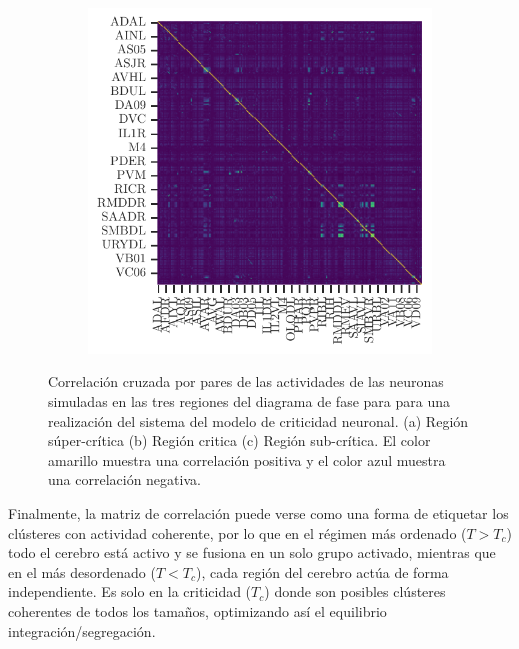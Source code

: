 \begin{figure}[h!]
\begin{subfigure}[b]{0.3\textwidth}
		\caption{}
		\label{fig:correlacion_critico}
	\end{subfigure}
	\begin{subfigure}[b]{0.3\textwidth}
		\centering
		\includegraphics[width=\textwidth]{correlacion_sub_critico.pdf}
		\caption{}
		\label{fig:correlacion_sub_critico}
	\end{subfigure}
	\caption[ Correlación cruzada por pares de las actividades de las neuronas simuladas  en las tres regiones del diagrama de fase para para una realización del sistema del modelo de criticidad neuronal.]{ Correlación cruzada por pares de las actividades de las neuronas simuladas  en las tres regiones del diagrama de fase para para una realización del sistema del modelo de criticidad neuronal. (a) Región súper-crítica  (b) Región critica (c) Región sub-crítica. El color amarillo muestra una correlación positiva y el color azul muestra una correlación negativa.} \label{fig:correlaciones_modelo}
\end{figure}


Finalmente,  la matriz de correlación  puede verse como una forma de etiquetar los clústeres con actividad coherente, por lo que en el régimen más ordenado ($T>T_c$) todo el cerebro está activo y se fusiona en un solo grupo  activado, mientras que en el más desordenado ($T<T_c$), cada región del cerebro actúa de forma independiente. Es solo en la criticidad ($T_c$) donde son posibles clústeres coherentes de todos los tamaños, optimizando así el equilibrio integración/segregación.


